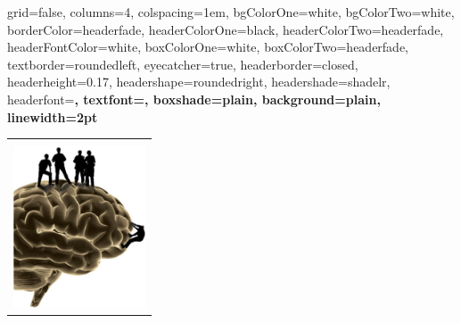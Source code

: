 \documentclass[landscape,a0paper,fontscale=0.3]{baposter}
\begin{document}




\begin{poster}%
  {
  grid=false,
  columns=4,
  colspacing=1em,
  bgColorOne=white,
  bgColorTwo=white,
  borderColor=headerfade,
  headerColorOne=black,
  headerColorTwo=headerfade,
  headerFontColor=white,
  boxColorOne=white,
  boxColorTwo=headerfade,
  textborder=roundedleft,
  eyecatcher=true,
  headerborder=closed,
  headerheight=0.17\textheight,
  headershape=roundedright,
  headershade=shadelr,
  headerfont=\Large\bf, %
  textfont={\setlength{\parindent}{1.5em}},
  boxshade=plain,
  background=plain,
  linewidth=2pt
  }
  {
    \begin{tabular}{c}
      \relax\\
      \includegraphics[height=13em]{brain.png}
    \end{tabular}
  }
  {
}
\end{poster}
\end{document}
